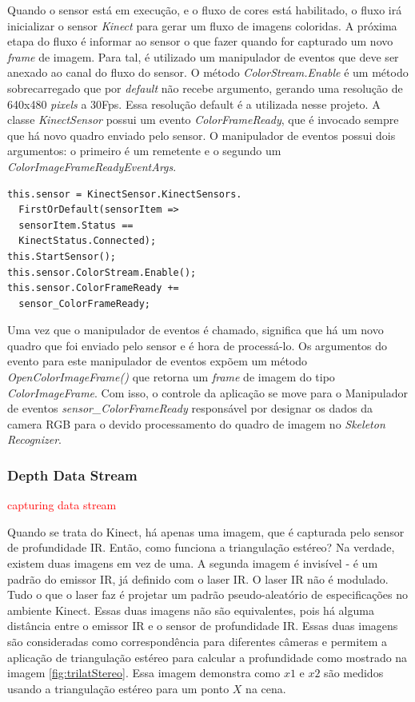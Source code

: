 Quando o sensor está em execução, e o fluxo de cores está habilitado, o fluxo irá inicializar o sensor \textit{Kinect} para gerar um fluxo de imagens coloridas. A próxima etapa do fluxo é informar ao sensor o que fazer quando for capturado um novo \textit{frame} de imagem. Para tal, é utilizado um manipulador de eventos que deve ser anexado ao canal do fluxo do sensor. O método \textit{ColorStream.Enable} é um método sobrecarregado que por \textit{default} não recebe argumento, gerando uma resolução de  640x480 \textit{pixels} a 30Fps. Essa resolução default é a utilizada nesse projeto. A classe \textit{KinectSensor} possui um evento \textit{ColorFrameReady}, que é invocado sempre que há novo quadro enviado pelo sensor. O manipulador de eventos possui dois argumentos: o primeiro é um remetente e o segundo um \textit{ColorImageFrameReadyEventArgs}.

\begin{verbatim}
this.sensor = KinectSensor.KinectSensors.
  FirstOrDefault(sensorItem => 
  sensorItem.Status == 
  KinectStatus.Connected);
this.StartSensor();
this.sensor.ColorStream.Enable();
this.sensor.ColorFrameReady += 
  sensor_ColorFrameReady;
\end{verbatim}


Uma vez que o manipulador de eventos é chamado, significa que há um novo quadro que foi enviado pelo sensor e é hora de processá-lo. Os argumentos do evento para este manipulador de eventos expõem um método \textit{OpenColorImageFrame()} que retorna um \textit{frame} de imagem do tipo \textit{ColorImageFrame}. Com isso, o controle da aplicação se move para o Manipulador de eventos \textit{sensor\_ColorFrameReady} responsável por designar os dados da camera RGB para o devido  processamento do quadro de imagem no \textit{Skeleton Recognizer}. 




\subsubsection{Depth Data Stream}\label{sec:depthDataStream}
\textcolor{red}{capturing data stream}

Quando se trata do Kinect, há apenas uma imagem, que é capturada pelo sensor de profundidade IR. Então, como funciona a triangulação estéreo? Na verdade, existem duas imagens em vez de uma. A segunda imagem é invisível - é um padrão do emissor IR, já definido com o laser IR. O laser IR não é modulado. Tudo o que o laser faz é projetar um padrão pseudo-aleatório de especificações no ambiente Kinect. Essas duas imagens não são equivalentes, pois há alguma distância entre o emissor IR e o sensor de profundidade IR. Essas duas imagens são consideradas como correspondência para diferentes câmeras e permitem a aplicação de triangulação estéreo para calcular a profundidade como mostrado na imagem \ref{fig:trilatStereo}. Essa imagem demonstra como $x1$ e $x2$ são medidos usando a triangulação estéreo para um ponto $X$ na cena. 

